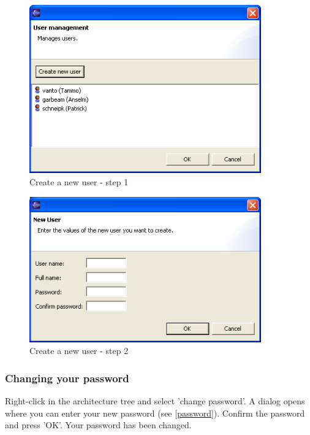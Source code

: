 \begin{figure}[h!]
\begin{center}
\includegraphics[width=10cm]{createuser1.png}
   \caption{Create a new user - step 1}
\label{createuser1}
\end{center}
\end{figure}\par

\begin{figure}[h!]
\begin{center}
\includegraphics[width=10cm]{createuser2.png}
   \caption{Create a new user - step 2}
\label{createuser2}
\end{center}
\end{figure}\par

\subsubsection{Changing your password}

Right-click in the architecture tree and select 'change password'. A dialog opens where you can
enter your new password (see \ref{password}). Confirm the password and press 'OK'. Your password has been changed.

